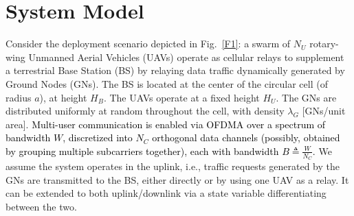 \documentclass[12pt, draftcls, onecolumn]{IEEEtran}
\theoremstyle{plain}
\theoremstyle{definition}
\theoremstyle{remark}
\newcommand\hlt[1]{\textcolor{black}{#1}}
\begin{document}
\section{System Model}\label{S2}
Consider the deployment scenario depicted in Fig.~\ref{F1}: a swarm of $N_{U}$ rotary-wing Unmanned Aerial Vehicles (UAVs) operate as cellular relays to supplement a terrestrial Base Station (BS) by relaying data traffic dynamically generated by Ground Nodes (GNs). The BS is located at the center of the circular cell (of radius $a$), at height $H_{B}$. The UAVs operate at a fixed height $H_{U}$. The GNs are distributed uniformly at random throughout the cell, with density $\lambda_{G}$ [GNs/unit area]. \hlt{Multi-user communication is enabled via OFDMA over a spectrum of bandwidth $W$, discretized into $N_{C}$ orthogonal data channels (possibly, obtained by grouping multiple subcarriers together), each with bandwidth $B{\triangleq}\frac{W}{N_{C}}$.} We assume the system operates in the uplink, i.e., traffic requests generated by the GNs are transmitted to the BS, either directly or by using one UAV as a relay. It can be extended to both uplink/downlink via a state variable differentiating between the two.
\end{document}
